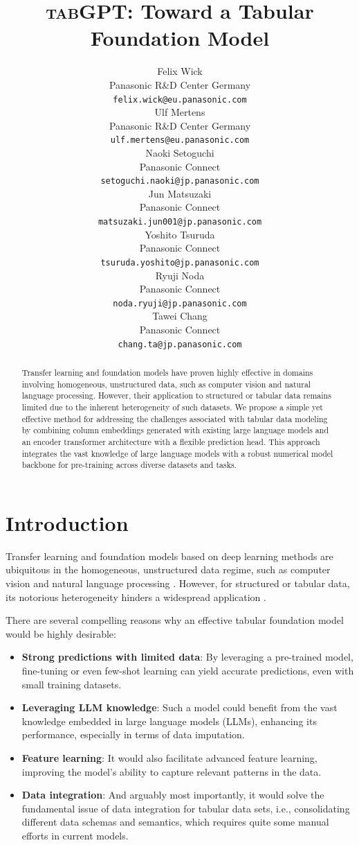 \documentclass{article}
\title{\textsc{tabGPT}: Toward a Tabular Foundation Model}
\author{
 Felix Wick \\
  Panasonic R\&D Center Germany \\
  \texttt{felix.wick@eu.panasonic.com} \\
   \And
 Ulf Mertens \\
  Panasonic R\&D Center Germany \\
  \texttt{ulf.mertens@eu.panasonic.com} \\
   \And
 Naoki Setoguchi \\
  Panasonic Connect \\
  \texttt{setoguchi.naoki@jp.panasonic.com} \\
   \And
 Jun Matsuzaki \\
  Panasonic Connect \\
  \texttt{matsuzaki.jun001@jp.panasonic.com} \\
   \And
 Yoshito Tsuruda \\
  Panasonic Connect \\
  \texttt{tsuruda.yoshito@jp.panasonic.com} \\
   \And
 Ryuji Noda \\
  Panasonic Connect \\
  \texttt{noda.ryuji@jp.panasonic.com} \\
   \And
 Tawei Chang \\
  Panasonic Connect \\
  \texttt{chang.ta@jp.panasonic.com} \\
}
\begin{document}
\maketitle

\begin{abstract}
Transfer learning and foundation models have proven highly effective in domains involving homogeneous, unstructured data, such as computer vision and natural language processing. However, their application to structured or tabular data remains limited due to the inherent heterogeneity of such datasets. We propose a simple yet effective method for addressing the challenges associated with tabular data modeling by combining column embeddings generated with existing large language models and an encoder transformer architecture with a flexible prediction head. This approach integrates the vast knowledge of large language models with a robust numerical model backbone for pre-training across diverse datasets and tasks.
\end{abstract}




\section{Introduction}
\label{sec:intro}

Transfer learning and foundation models based on deep learning methods are ubiquitous in the homogeneous, unstructured data regime, such as computer vision and natural language processing \cite{krizhevsky2012,dubey2024}. However, for structured or tabular data, its notorious heterogeneity hinders a widespread application \cite{grinsztajn2022}.

There are several compelling reasons why an effective tabular foundation model would be highly desirable:
\begin{itemize}
\item \textbf{Strong predictions with limited data}: By leveraging a pre-trained model, fine-tuning or even few-shot learning can yield accurate predictions, even with small training datasets.
\item \textbf{Leveraging LLM knowledge}: Such a model could benefit from the vast knowledge embedded in large language models (LLMs), enhancing its performance, especially in terms of data imputation.
\item \textbf{Feature learning}: It would also facilitate advanced feature learning, improving the model's ability to capture relevant patterns in the data.
\item \textbf{Data integration}: And arguably most importantly, it would solve the fundamental issue of data integration for tabular data sets, i.e., consolidating different data schemas and semantics, which requires quite some manual efforts in current models.
\end{itemize}
\end{document}
